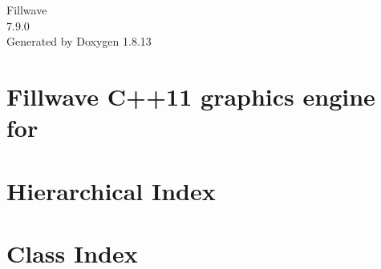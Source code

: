 \documentclass[twoside]{book}
\newcommand{\+}{\discretionary{\mbox{\scriptsize$\hookleftarrow$}}{}{}}
\newcommand{\clearemptydoublepage}{%
  \newpage{\pagestyle{empty}\cleardoublepage}%
}
\begin{document}
\hypersetup{pageanchor=false,
             bookmarksnumbered=true,
             pdfencoding=unicode
            }
\begin{titlepage}
\vspace*{7cm}
\begin{center}%
{\Large Fillwave \\[1ex]\large 7.\+9.\+0 }\\
\vspace*{1cm}
{\large Generated by Doxygen 1.8.13}\\
\end{center}
\end{titlepage}
\clearemptydoublepage
{}
\tableofcontents
\clearemptydoublepage
{}
\hypersetup{pageanchor=true}

\chapter{Fillwave C++11 graphics engine for}
\label{index}\hypertarget{index}{}
\chapter{Hierarchical Index}

\chapter{Class Index}

\end{document}
